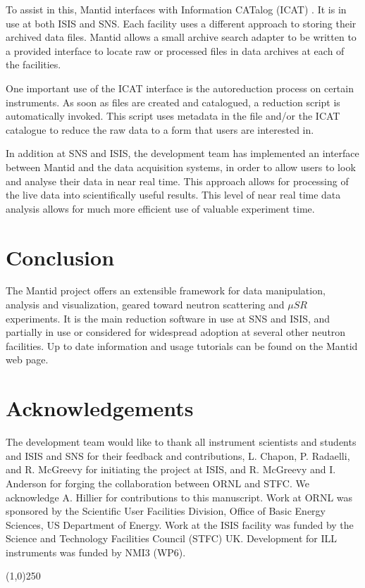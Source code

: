 \documentclass[1p]{elsarticle}
\begin{document}
To assist in this, Mantid interfaces with Information CATalog (ICAT) \cite{ICAT}. 
It is in use at both ISIS and SNS. Each facility uses a different approach to storing their archived data files. Mantid allows a small archive search adapter to be written to a provided interface to locate raw or processed files in data archives at each of the facilities.

One important use of the ICAT interface is the autoreduction process on certain instruments. As soon as files are created and catalogued, a reduction script is automatically invoked. This script uses metadata in the file and/or the ICAT catalogue to reduce the raw data to a form that users are interested in. 

In addition at SNS and ISIS, the development team has implemented an interface between Mantid and the data acquisition systems, in order to allow users to look and analyse their data in near real time. This approach allows for processing of the live data into scientifically useful results. This level of near real time data analysis allows for much more efficient use of valuable experiment time.  


\section{Conclusion}
The Mantid project offers an extensible framework for data manipulation, analysis and visualization, geared toward neutron scattering and $\mu SR$ experiments. It is the main reduction software in use at SNS and ISIS, and partially in use or considered for widespread adoption at several other neutron facilities. Up to date information and usage tutorials can be found on the Mantid web page\cite{webpage}. 

\section{Acknowledgements}
The development team would like to thank all instrument scientists and students and ISIS and SNS for their feedback and contributions, L. Chapon, P. Radaelli, and R. McGreevy for initiating the project at ISIS, and R. McGreevy and I. Anderson for forging the collaboration between ORNL and STFC. We acknowledge A. Hillier for contributions to this manuscript. Work at ORNL was sponsored by the Scientific User Facilities Division, Office of Basic Energy Sciences, US Department of Energy. Work at the ISIS facility was funded by the Science and Technology Facilities Council (STFC) UK. Development for ILL instruments was funded by NMI3 (WP6).

\begin{center}
\line(1,0){250}
\end{center}


{}

\end{document}
